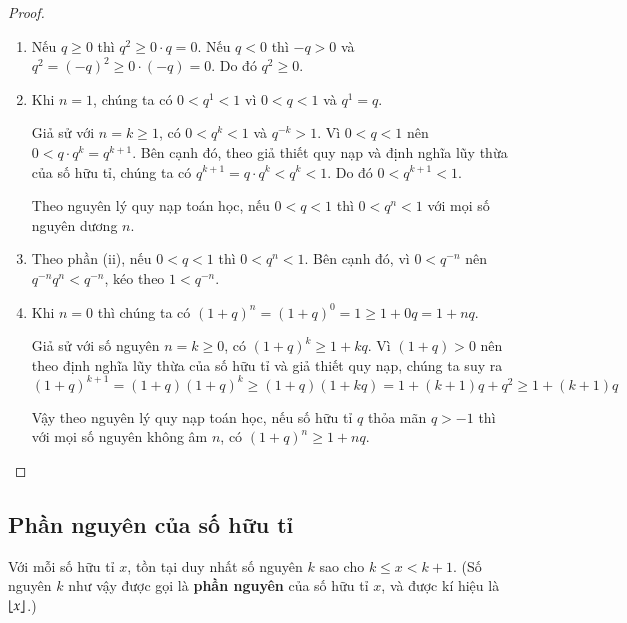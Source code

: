\begin{proof}
    \begin{enumerate}[label={(\roman*)}]
        \item Nếu $q\geq 0$ thì $q^{2}\geq 0\cdot q = 0$. Nếu $q < 0$ thì $-q > 0$ và $q^{2} = {(-q)}^{2}\geq 0\cdot (-q) = 0$. Do đó $q^{2}\geq 0$.
        \item Khi $n = 1$, chúng ta có $0 < q^{1} < 1$ vì $0 < q < 1$ và $q^{1} = q$.

              Giả sử với $n = k\geq 1$, có $0 < q^{k} < 1$ và $q^{-k} > 1$. Vì $0 < q < 1$ nên $0 < q\cdot q^{k} = q^{k+1}$. Bên cạnh đó, theo giả thiết quy nạp và định nghĩa lũy thừa của số hữu tỉ, chúng ta có $q^{k+1} = q\cdot q^{k} < q^{k} < 1$. Do đó $0 < q^{k+1} < 1$.

              Theo nguyên lý quy nạp toán học, nếu $0 < q < 1$ thì $0 < q^{n} < 1$ với mọi số nguyên dương $n$.
        \item Theo phần (ii), nếu $0 < q < 1$ thì $0 < q^{n} < 1$. Bên cạnh đó, vì $0 < q^{-n}$ nên $q^{-n}q^{n} < q^{-n}$, kéo theo $1 < q^{-n}$.
        \item Khi $n = 0$ thì chúng ta có ${(1 + q)}^{n} = {(1 + q)}^{0} = 1 \geq 1 + 0q = 1 + nq$.

              Giả sử với số nguyên $n = k\geq 0$, có ${(1 + q)}^{k} \geq 1 + kq$. Vì $(1 + q) > 0$ nên theo định nghĩa lũy thừa của số hữu tỉ và giả thiết quy nạp, chúng ta suy ra
              \[
                  {(1 + q)}^{k+1} = (1 + q){(1 + q)}^{k} \geq (1 + q)(1 + kq) = 1 + (k+1)q + q^{2} \geq 1 + (k + 1)q
              \]

              Vậy theo nguyên lý quy nạp toán học, nếu số hữu tỉ $q$ thỏa mãn $q > -1$ thì với mọi số nguyên không âm $n$, có ${(1 + q)}^{n}\geq 1 + nq$.
    \end{enumerate}
\end{proof}

\subsection{Phần nguyên của số hữu tỉ}

\begin{theorem}
    Với mỗi số hữu tỉ $x$, tồn tại duy nhất số nguyên $k$ sao cho $k\leq x < k+1$. (Số nguyên $k$ như vậy được gọi là \textbf{phần nguyên} của số hữu tỉ $x$, và được kí hiệu là $\left\lfloor{x}\right\rfloor$.)
\end{theorem}

